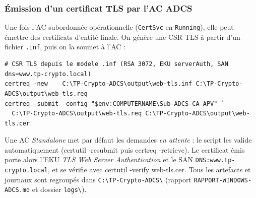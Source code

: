 \documentclass[11pt,a4paper]{article}
\newcommand{\fichier}[1]{\texttt{#1}}
\newcommand{\cmdinline}[1]{\colorbox{outbg}{\ttfamily\small #1}}
\begin{document}
\subsubsection{Émission d'un certificat TLS par l'AC ADCS}
Une fois l'AC subordonnée opérationnelle (\texttt{CertSvc} en \texttt{Running}), elle peut
émettre des certificats d'entité finale. On génère une CSR TLS à partir d'un fichier
\fichier{.inf}, puis on la soumet à l'AC :
\begin{lstlisting}[style=cmd]
# CSR TLS depuis le modele .inf (RSA 3072, EKU serverAuth, SAN dns=www.tp-crypto.local)
certreq -new    C:\TP-Crypto-ADCS\output\web-tls.inf C:\TP-Crypto-ADCS\output\web-tls.req
certreq -submit -config "$env:COMPUTERNAME\Sub-ADCS-CA-APV" `
  C:\TP-Crypto-ADCS\output\web-tls.req C:\TP-Crypto-ADCS\output\web-tls.cer
\end{lstlisting}
\begin{notebox}
Une AC \emph{Standalone} met par défaut les demandes \emph{en attente} : le script les
valide automatiquement (\cmdinline{certutil -resubmit} puis \cmdinline{certreq -retrieve}).
Le certificat émis porte alors l'EKU \emph{TLS Web Server Authentication} et le SAN
\texttt{DNS:www.tp-crypto.local}, et se vérifie avec \cmdinline{certutil -verify
web-tls.cer}. Tous les artefacts et journaux sont regroupés dans
\fichier{C:\textbackslash TP-Crypto-ADCS\textbackslash} (rapport
\fichier{RAPPORT-WINDOWS-ADCS.md} et dossier \fichier{logs\textbackslash}).
\end{notebox}
\end{document}
